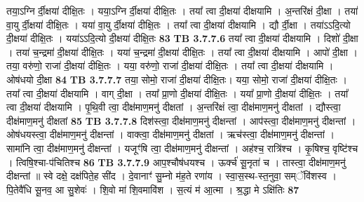 \documentclass[17pt]{extarticle}
\begin{document}
{{{{{{{{{{{{{{{{{{{                  तया॒ऽग्नि र्दी॒क्षया॑ दीक्षि॒तः । यया॒ऽग्नि र्दी॒क्षया॑ दीक्षि॒तः । तया᳚ त्वा दी॒क्षया॑ दीक्षयामि । अ॒न्तरि॑क्षं दी॒क्षा । तया॑ वा॒यु र्दी॒क्षया॑ दीक्षि॒तः । यया॑ वा॒यु र्दी॒क्षया॑ दीक्षि॒तः । तया᳚ त्वा दी॒क्षया॑ दीक्षयामि । द्यौ र्दी॒क्षा । तया॑ऽऽदि॒त्यो दी॒क्षया॑ दीक्षि॒तः । यया॑ऽऽदि॒त्यो दी॒क्षया॑ दीक्षि॒तः \textbf{ 83} \newline
                  \newline
                                \textbf{ TB 3.7.7.6} \newline
                  तया᳚ त्वा दी॒क्षया॑ दीक्षयामि । दिशो॑ दी॒क्षा । तया॑ च॒न्द्रमा॑ दी॒क्षया॑ दीक्षि॒तः । यया॑ च॒न्द्रमा॑ दी॒क्षया॑ दीक्षि॒तः । तया᳚ त्वा दी॒क्षया॑ दीक्षयामि । आपो॑ दी॒क्षा । तया॒ वरु॑णो॒ राजा॑ दी॒क्षया॑ दीक्षि॒तः । यया॒ वरु॑णो॒ राजा॑ दी॒क्षया॑ दीक्षि॒तः । तया᳚ त्वा दी॒क्षया॑ दीक्षयामि । ओष॑धयो दी॒क्षा \textbf{ 84} \newline
                  \newline
                                \textbf{ TB 3.7.7.7} \newline
                  तया॒ सोमो॒ राजा॑ दी॒क्षया॑ दीक्षि॒तः। यया॒ सोमो॒ राजा॑ दी॒क्षया॑ दीक्षि॒तः । तया᳚ त्वा दी॒क्षया॑ दीक्षयामि । वाग् दी॒क्षा । तया᳚ प्रा॒णो दी॒क्षया॑ दीक्षि॒तः । यया᳚ प्रा॒णो दी॒क्षया॑ दीक्षि॒तः । तया᳚ त्वा दी॒क्षया॑ दीक्षयामि । पृ॒थि॒वी त्वा॒ दीक्ष॑माण॒मनु॑ दीक्षतां । अ॒न्तरि॑क्षं त्वा॒ दीक्ष॑माण॒मनु॑ दीक्षतां । द्यौस्त्वा॒ दीक्ष॑माण॒मनु॑ दीक्षतां \textbf{ 85} \newline
                  \newline
                                \textbf{ TB 3.7.7.8} \newline
                  दिश॑स्त्वा॒ दीक्ष॑माण॒मनु॑ दीक्षन्तां । आप॑स्त्वा॒ दीक्ष॑माण॒मनु॑ दीक्षन्तां । ओष॑धयस्त्वा॒ दीक्ष॑माण॒मनु॑ दीक्षन्तां । वाक्त्वा॒ दीक्ष॑माण॒मनु॑ दीक्षतां । ऋच॑स्त्वा॒ दीक्ष॑माण॒मनु॑ दीक्षन्तां । सामा॑नि त्वा॒ दीक्ष॑माण॒मनु॑ दीक्षन्तां । यजूꣳ॑षि त्वा॒ दीक्ष॑माण॒मनु॑ दीक्षन्तां । अह॑श्च॒ रात्रि॑श्च । कृ॒षिश्च॒ वृष्टि॑श्च । त्विषि॒श्चा-प॑चितिश्च \textbf{ 86} \newline
                  \newline
                                \textbf{ TB 3.7.7.9} \newline
                  आप॒श्चौष॑धयश्च । ऊर्क्च॑ सू॒नृता॑ च । तास्त्वा॒ दीक्ष॑माण॒मनु॑ दीक्षन्तां ॥ स्वे दक्षे॒ दक्ष॑पिते॒ह सी॑द । दे॒वानाꣳ॑ सु॒म्नो म॑ह॒ते रणा॑य । स्वा॒स॒स्थ-स्त॒नुवा॒ सम्ॅवि॑शस्व । पि॒तेवै॑धि सू॒नव॒ आ सु॒शेवः॑ । शि॒वो मा॑ शि॒वमावि॑श । स॒त्यं म॑ आ॒त्मा । श्र॒द्धा मे ऽक्षि॑तिः \textbf{ 87} \newline
}}}}}}}}}}}}}}}}}}}
\end{document}
